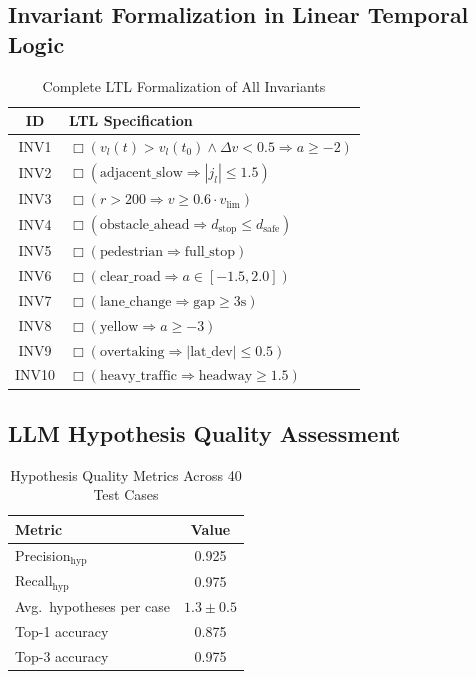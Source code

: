 \documentclass[journal]{IEEEtran}
\theoremstyle{plain}
\theoremstyle{definition}
\theoremstyle{remark}
\begin{document}
\subsection{Invariant Formalization in Linear Temporal Logic}

\begin{table}[h]
\centering
\caption{Complete LTL Formalization of All Invariants}
\label{tab:inv_formal}
\small
\begin{tabular}{cl}
\toprule
\textbf{ID} & \textbf{LTL Specification} \\\midrule
INV1 & $\Box(v_l(t) > v_l(t_0) \land \Delta v < 0.5 \Rightarrow a \geq -2)$\\
INV2 & $\Box(\text{adjacent\_slow} \Rightarrow |j_l| \leq 1.5)$\\
INV3 & $\Box(r > 200 \Rightarrow v \geq 0.6\cdot v_{\text{lim}})$\\
INV4 & $\Box(\text{obstacle\_ahead} \Rightarrow d_{\text{stop}} \leq d_{\text{safe}})$\\
INV5 & $\Box(\text{pedestrian} \Rightarrow \text{full\_stop})$\\
INV6 & $\Box(\text{clear\_road} \Rightarrow a \in [-1.5,2.0])$\\
INV7 & $\Box(\text{lane\_change} \Rightarrow \text{gap} \geq 3\text{s})$\\
INV8 & $\Box(\text{yellow} \Rightarrow a \geq -3)$\\
INV9 & $\Box(\text{overtaking} \Rightarrow |\text{lat\_dev}| \leq 0.5)$\\
INV10 & $\Box(\text{heavy\_traffic} \Rightarrow \text{headway} \geq 1.5)$\\
\bottomrule
\end{tabular}
\end{table}

\subsection{LLM Hypothesis Quality Assessment}

\begin{table}[h]
\centering
\caption{Hypothesis Quality Metrics Across 40 Test Cases}
\label{tab:llm_quality}
\begin{tabular}{lc}
\toprule
\textbf{Metric} & \textbf{Value} \\\midrule
Precision$_{\text{hyp}}$ & 0.925 \\
Recall$_{\text{hyp}}$ & 0.975 \\
Avg.\ hypotheses per case & $1.3 \pm 0.5$ \\
Top-1 accuracy & 0.875 \\
Top-3 accuracy & 0.975 \\
\bottomrule
\end{tabular}
\end{table}
\end{document}
